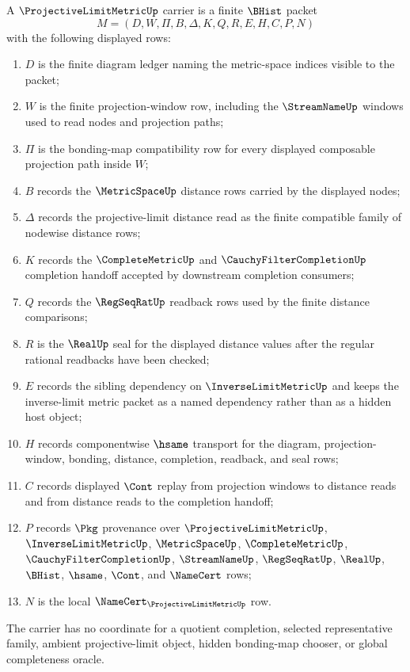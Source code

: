 \begin{definition}
\label{def:projective-limit-metric-carrier}
A $\ProjectiveLimitMetricUp$ carrier is a finite $\BHist$ packet
$$
M=(D,W,\Pi,B,\Delta,K,Q,R,E,H,C,P,N)
$$
with the following displayed rows:
\begin{enumerate}
\item $D$ is the finite diagram ledger naming the metric-space indices visible to the packet;
\item $W$ is the finite projection-window row, including the $\StreamNameUp$ windows used to read nodes and projection paths;
\item $\Pi$ is the bonding-map compatibility row for every displayed composable projection path inside $W$;
\item $B$ records the $\MetricSpaceUp$ distance rows carried by the displayed nodes;
\item $\Delta$ records the projective-limit distance read as the finite compatible family of nodewise distance rows;
\item $K$ records the $\CompleteMetricUp$ and $\CauchyFilterCompletionUp$ completion handoff accepted by downstream completion consumers;
\item $Q$ records the $\RegSeqRatUp$ readback rows used by the finite distance comparisons;
\item $R$ is the $\RealUp$ seal for the displayed distance values after the regular rational readbacks have been checked;
\item $E$ records the sibling dependency on $\InverseLimitMetricUp$ and keeps the inverse-limit metric packet as a named dependency rather than as a hidden host object;
\item $H$ records componentwise $\hsame$ transport for the diagram, projection-window, bonding, distance, completion, readback, and seal rows;
\item $C$ records displayed $\Cont$ replay from projection windows to distance reads and from distance reads to the completion handoff;
\item $P$ records $\Pkg$ provenance over $\ProjectiveLimitMetricUp$, $\InverseLimitMetricUp$, $\MetricSpaceUp$, $\CompleteMetricUp$, $\CauchyFilterCompletionUp$, $\StreamNameUp$, $\RegSeqRatUp$, $\RealUp$, $\BHist$, $\hsame$, $\Cont$, and $\NameCert$ rows;
\item $N$ is the local $\NameCert_{\ProjectiveLimitMetricUp}$ row.
\end{enumerate}
The carrier has no coordinate for a quotient completion, selected representative family, ambient projective-limit object, hidden bonding-map chooser, or global completeness oracle.
\end{definition}

